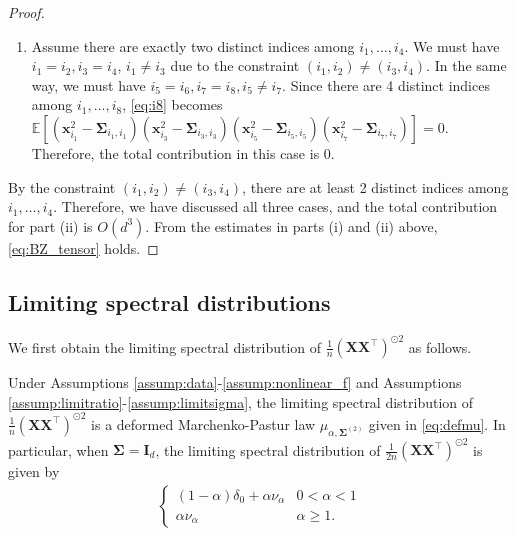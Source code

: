 \documentclass[twoside,11pt]{article}
\newcommand{\E}{\mathbb{E}}
\def\bI{{\mathbf I}}
\def\bX{{\boldsymbol X}}
\def\bx{{\boldsymbol x}}
\def\bSigma{{\boldsymbol \Sigma}}
\newcommand{\1}{\mathbf{1}}
\begin{document}
\begin{proof}
\begin{enumerate}
   
    \item  Assume there are exactly two distinct indices among $i_1,\dots, i_4$. We must have $i_1=i_2,i_3=i_4$, $i_1\not=i_3$ due to the constraint $(i_1,i_2)\not=(i_3,i_4)$.  In the same way, we must have $i_5=i_6, i_7=i_8, i_5\not=i_7$. 
Since there are 4 distinct indices among  $i_1,\dots,i_8$,   \eqref{eq:i8} becomes
  $ 
\E[(\bx_{i_1}^2-\bSigma_{i_1,i_1})(\bx_{i_3}^2-\bSigma_{i_3,i_3})(\bx_{i_5}^2-\bSigma_{i_5,i_5})(\bx_{i_7}^2-\bSigma_{i_7,i_7})]=0$.
    Therefore, the total contribution in this case is $0$.
\end{enumerate}
By the constraint $(i_1,i_2)\not=(i_3,i_4)$, there are at least 2 distinct indices among $i_1,\dots,i_4$. Therefore, we have discussed all three cases, and the total contribution for part (ii) is $O(d^3)$.
From the estimates in parts (i) and (ii) above, \eqref{eq:BZ_tensor} holds. 
\end{proof}
    



\subsection{Limiting spectral distributions}
We first obtain the  limiting spectral distribution of $\frac{1}{n}(\bX  \bX^\top)^{\odot 2}$ as follows.
\begin{lemma}\label{lem:MP_tensor}
Under Assumptions \ref{assump:data}-\ref{assump:nonlinear_f} and Assumptions \ref{assump:limitratio}-\ref{assump:limitsigma}, the limiting spectral distribution of $\frac{1}{n}(\bX \bX^\top )^{\odot 2}$ is a deformed Marchenko-Pastur law $\mu_{\alpha,\bSigma^{(2)}}$ given  in \eqref{eq:defmu}.      In particular, when $\bSigma=\bI_d$, the limiting spectral distribution of $\frac{1}{2n}(\bX  \bX^\top)^{\odot 2}$ is given by 
  \begin{align} \label{eq:law_MP}
  \begin{cases}
             (1-\alpha)\delta_0+\alpha \nu_{\alpha} & 0<\alpha <1\\
             \alpha\nu_{\alpha}& \alpha\geq 1.
         \end{cases}
    \end{align}
\end{lemma}
\end{document}
